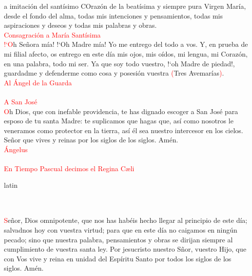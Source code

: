 \documentclass[9pt]{article}
\begin{document}
\begin{multicols}{2}
      a imitación del santísimo COrazón de la beatísima y siempre pura Virgen María, desde el fondo del alma, todas mis intenciones y pensamientos, todas mis aspiraciones y deseos y todas mis
      palabras y obras.\\[1mm]
      \textcolor{red}{Consagración a María Santísima}\\
      \textcolor{red}{{!`}O}h Señora mía! {!`}Oh Madre mía! Yo me entrego del todo a vos. Y, en prueba de mi filial afecto, os entrego en este día mis ojos, mis oídos, mi lengua, mi Corazón,
      en una palabra, todo mi ser. Ya que soy todo vuestro, {!`}oh Madre de piedad!, guardadme y defenderme como cosa y posesión vuestra \textcolor{red}{(}Tres Avemarías\textcolor{red}{)}.\\[1mm]
      \textcolor{red}{Al Ángel de la Guarda}\\[-6.5mm]
      \\[1mm]
      \textcolor{red}{A San José}\\
      \textcolor{red}{O}h Dios, que con inefable providencia, te has dignado escoger a San José  para esposo de tu santa Madre: te suplicamos que hagas que, así como nosotros le veneramos
      como protector en la tierra, así él sea nuestro intercesor en los cielos. Señor que vives y reinas por los siglos de los siglos. Amén.\\[1mm]
      \textcolor{red}{Ángelus}\\
      \\[2mm]
      \textcolor{red}{En Tiempo Pascual decimos el Regina C{\ae}li}\\
      \begin{otherlanguage*}{latin}
            \\[0.5mm]
            \\[2mm]
            \\[2mm]
      \end{otherlanguage*}
      \textcolor{red}{S}eñor, Dios omnipotente, que nos has habéis hecho llegar al principio de este día; salvadnos hoy con vuestra virtud; para que en este día no caigamos en ningún pecado;
      sino que nuestra palabra, pensamientos y obras se dirijan siempre al cumplimiento de vuestra santa ley. Por jesucristo nuestro Sñor, vuestro Hijo, que con Vos vive y reina en unidad
      del Espíritu Santo por todos los siglos de los siglos. Amén.\\[2mm]
      
\end{multicols}
\end{document}
